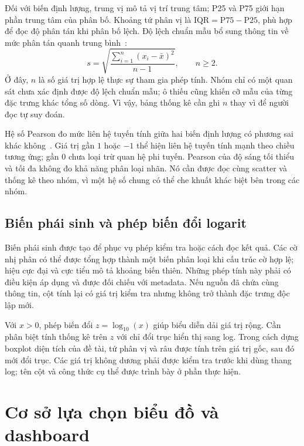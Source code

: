Đối với biến định lượng, trung vị mô tả vị trí trung tâm; P25 và P75 giới hạn phần trung tâm của phân bố. Khoảng tứ phân vị là $\mathrm{IQR}=\mathrm{P75}-\mathrm{P25}$, phù hợp để đọc độ phân tán khi phân bố lệch. Độ lệch chuẩn mẫu bổ sung thông tin về mức phân tán quanh trung bình~\cite{nistbox}:
\begin{equation}
  s=\sqrt{\frac{\sum_{i=1}^{n}(x_i-\bar{x})^2}{n-1}},
  \qquad n\geq2.
  \label{eq:dolechchuan}
\end{equation}
Ở đây, $n$ là số giá trị hợp lệ thực sự tham gia phép tính. Nhóm chỉ có một quan sát chưa xác định được độ lệch chuẩn mẫu; ô thiếu cũng khiến cỡ mẫu của từng đặc trưng khác tổng số dòng. Vì vậy, bảng thống kê cần ghi $n$ thay vì để người đọc tự suy đoán.

Hệ số Pearson đo mức liên hệ tuyến tính giữa hai biến định lượng có phương sai khác không~\cite{niststats}. Giá trị gần $1$ hoặc $-1$ thể hiện liên hệ tuyến tính mạnh theo chiều tương ứng; gần $0$ chưa loại trừ quan hệ phi tuyến. Pearson của độ sáng tối thiểu và tối đa không đo khả năng phân loại nhãn. Nó cần được đọc cùng scatter và thống kê theo nhóm, vì một hệ số chung có thể che khuất khác biệt bên trong các nhóm.

\subsection{Biến phái sinh và phép biến đổi logarit}

Biến phái sinh được tạo để phục vụ phép kiểm tra hoặc cách đọc kết quả. Các cờ nhị phân có thể được tổng hợp thành một biến phân loại khi cấu trúc cờ hợp lệ; hiệu cực đại và cực tiểu mô tả khoảng biến thiên. Những phép tính này phải có điều kiện áp dụng và được đối chiếu với metadata. Nếu nguồn đã chứa cùng thông tin, cột tính lại có giá trị kiểm tra nhưng không trở thành đặc trưng độc lập mới.

Với $x>0$, phép biến đổi $z=\log_{10}(x)$ giúp biểu diễn dải giá trị rộng. Cần phân biệt tính thống kê trên $z$ với chỉ đổi trục hiển thị sang log. Trong cách dựng boxplot diện tích của đề tài, tứ phân vị và râu được tính trên giá trị gốc, sau đó mới đổi trục. Các giá trị không dương phải được kiểm tra trước khi dùng thang log; tên cột và công thức cụ thể được trình bày ở phần thực hiện.

\section{Cơ sở lựa chọn biểu đồ và dashboard}
\label{sec:bieudodashboard}

